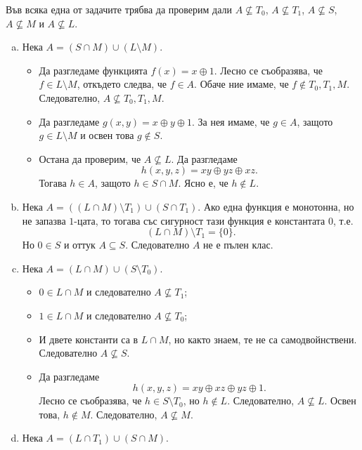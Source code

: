 \begin{solution}
  Във всяка една от задачите трябва да проверим дали
  $A \not\subseteq T_0$, 
  $A \not\subseteq T_1$, 
  $A \not\subseteq S$, 
  $A \not\subseteq M$ и 
  $A \not\subseteq L$.
  \begin{enumerate}[a)]
  \item 
    Нека $A = (S \cap M) \cup (L\setminus M)$.
    \begin{itemize}
    \item 
      Да разгледаме функцията 
      $f(x) = x \oplus 1$.
      Лесно се съобразява, че $f \in L\setminus M$, откъдето  следва, че $f \in A$.
      Обаче ние имаме, че $f \not\in T_0, T_1, M$.
      Следователно, $A \not\subseteq T_0, T_1, M$.
    \item
      Да разгледаме $g(x,y) = x\oplus y \oplus 1$.
      За нея имаме, че $g \in A$, защото $g \in L\setminus M$ и освен това $g \not\in S$.
    \item
      Остана да проверим, че $A \not\subseteq L$.
      Да разгледаме 
      \[h(x,y,z) = xy\oplus yz \oplus xz.\]
      Тогава $h \in A$, защото $h \in S\cap M$.
      Ясно е, че $h \not\in L$.
    \end{itemize}
  \item
    Нека $A = ((L\cap M)\setminus T_1)\cup (S\cap T_1)$.
    Ако една функция е монотонна, но не запазва $1$-цата, то тогава 
    със сигурност тази функция е константата $0$, т.е.
    \[(L \cap M)\setminus T_1 = \{0\}.\]
    Но $0 \in S$ и оттук $A \subseteq S$.
    Следователно $A$ не е пълен клас.
  \item
    Нека $A = (L\cap M)\cup (S\setminus T_0)$.
    \begin{itemize}
    \item
      $0 \in L \cap M$ и следователно $A \not\subseteq T_1$;
    \item
      $1 \in L \cap M$ и следователно $A \not\subseteq T_0$;
    \item
      И двете константи са в $L \cap M$, но както знаем, те  не са самодвойнствени.
      Следователно $A \not\subseteq S$.
    \item
      Да разгледаме
      \[h(x,y,z) = xy\oplus xz \oplus yz \oplus 1.\]
      Лесно се съобразява, че $h \in S \setminus T_0$, но $h \not\in L$.
      Следователно, $A \not\subseteq L$.
      Освен това, $h \not \in M$. Следователно, $A \not\subseteq M$.
    \end{itemize}
  \item
    Нека $A = (L \cap T_1) \cup (S \cap M)$.

\end{enumerate}
\end{solution}
